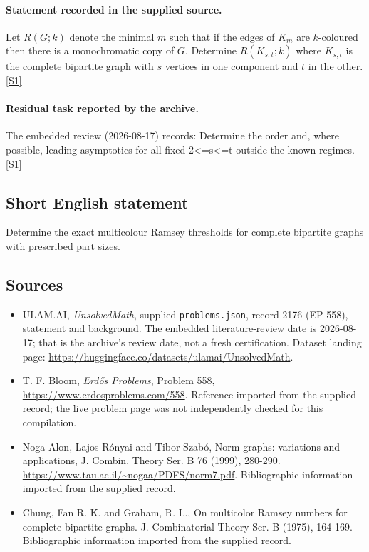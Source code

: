 \documentclass[11pt,a4paper]{article}
\newcommand{\sref}[2]{\hyperlink{source:#1:#2}{[S#2]}}
\begin{document}
\paragraph{Statement recorded in the supplied source.}
Let $R(G;k)$ denote the minimal $m$ such that if the edges of $K_m$ are $k$-coloured then there is a monochromatic copy of $G$. Determine $ R(K_{s,t};k) $ where $K_{s,t}$ is the complete bipartite graph with $s$ vertices in one component and $t$ in the other. \sref{2176}{1}

\paragraph{Residual task reported by the archive.}

The embedded review (2026-08-17) records: Determine the order and, where possible, leading asymptotics for all fixed 2<=s<=t outside the known regimes. \sref{2176}{1}

\subsection{Short English statement}

Determine the exact multicolour Ramsey thresholds for complete bipartite graphs with prescribed part sizes.

\subsection{Sources}

{\small

\begin{itemize}

\item[\hypertarget{source:2176:1}{S1}] ULAM.AI, \emph{UnsolvedMath}, supplied \texttt{problems.json}, record 2176 (EP-558), statement and background. The embedded literature-review date is 2026-08-17; that is the archive’s review date, not a fresh certification. Dataset landing page: \url{https://huggingface.co/datasets/ulamai/UnsolvedMath}.

\item[\hypertarget{source:2176:2}{S2}] T. F. Bloom, \emph{Erdős Problems}, Problem 558, \url{https://www.erdosproblems.com/558}. Reference imported from the supplied record; the live problem page was not independently checked for this compilation.

\item[\hypertarget{source:2176:3}{S3}] Noga Alon, Lajos Rónyai and Tibor Szabó, Norm-graphs: variations and applications, J. Combin. Theory Ser. B 76 (1999), 280-290. \url{https://www.tau.ac.il/~nogaa/PDFS/norm7.pdf}. Bibliographic information imported from the supplied record.

\item[\hypertarget{source:2176:4}{S4}] Chung, Fan R. K. and Graham, R. L., On multicolor Ramsey numbers for complete bipartite graphs. J. Combinatorial Theory Ser. B (1975), 164-169. Bibliographic information imported from the supplied record.

\end{itemize}

}

\label{end:2176}
\end{document}
